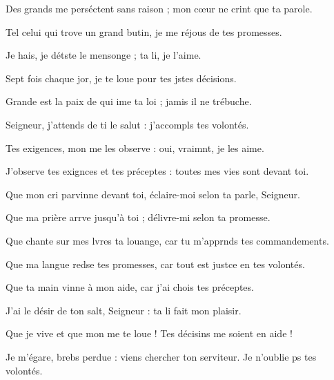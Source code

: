 \item Des grands me perséctent sans raison ;\psstar{} mon cœur ne crint que ta parole.
\item Tel celui qui trove un grand butin,\psstar{} je me réjous de tes promesses.
\item Je hais, je détste le mensonge ;\psstar{} ta li, je l’aime.
\item Sept fois chaque jor, je te loue\psstar{} pour tes jstes décisions.
\item Grande est la paix de qui ime ta loi ;\psstar{} jamis il ne trébuche.
\item Seigneur, j’attends de ti le salut :\psstar{} j’accompls tes volontés.
\item Tes exigences, mon me les observe :\psstar{} oui, vraimnt, je les aime.
\item J’observe tes exignces et tes préceptes :\psstar{} toutes mes vies sont devant toi.
\item Que mon cri parvinne devant toi,\psstar{} éclaire-moi selon ta parle, Seigneur.
\item Que ma prière arrve jusqu’à toi ;\psstar{} délivre-mi selon ta promesse.
\item Que chante sur mes lvres ta louange,\psstar{} car tu m’apprnds tes commandements.
\item Que ma langue redse tes promesses,\psstar{} car tout est justce en tes volontés.
\item Que ta main vinne à mon aide,\psstar{} car j’ai chois tes préceptes.
\item J’ai le désir de ton salt, Seigneur :\psstar{} ta li fait mon plaisir.
\item Que je vive et que mon me te loue !\psstar{} Tes décisins me soient en aide !
\item Je m’égare, brebs perdue :\psstar{} viens chercher ton serviteur. Je n’oublie ps tes volontés.